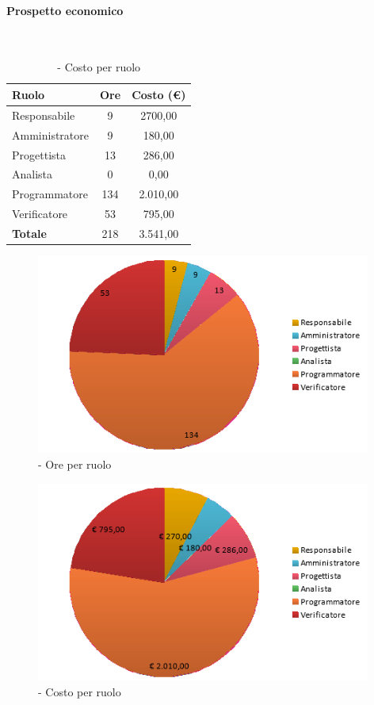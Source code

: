 \documentclass[./PianoDiProgetto.tex]{subfiles}
\begin{document}
	\paragraph{Prospetto economico}\

	\begin{table}[H]
		\centering

		\begin{tabular}{l * {2}{c}}
			\toprule
			\textbf{Ruolo} & \textbf{Ore} & \textbf{Costo (\euro{})} \\
			\midrule
			Responsabile & 9    &  2700,00 \\
			Amministratore  & 9    &  180,00 \\
			Progettista  & 13   &  286,00 \\
			Analista & 0    &  0,00 \\
			Programmatore  & 134    &  2.010,00 \\
			Verificatore  & 53    &  795,00 \\
			\midrule
			\textbf{Totale}  & 218   &  3.541,00 \\
			\bottomrule
		\end{tabular}
		\caption{\PerC{} - Costo per ruolo}
	\end{table}

\vspace{35mm}

	\begin{figure}[H]
		\centering
		\includegraphics[width=11cm, trim=1cm 0cm 1cm 0cm]{grafici/C-ruolo}
			\caption{\PerC{} - Ore per ruolo}
	\end{figure}
\vfill
	\begin{figure}[H]
		\centering
		\includegraphics[width=11cm, trim=1cm 0cm 1cm 0cm]{grafici/C-costo}
			\caption{\PerC{} - Costo per ruolo}
	\end{figure}
\end{document}
